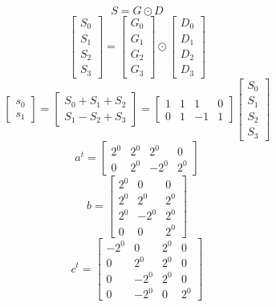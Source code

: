 \documentclass{article}%
\begin{document}
\[%
S = G \odot D%
\]%
\[%
\left[\begin{matrix}S_{0}\\S_{1}\\S_{2}\\S_{3}\end{matrix}\right] = \left[\begin{matrix}G_{0}\\G_{1}\\G_{2}\\G_{3}\end{matrix}\right] \odot \left[\begin{matrix}D_{0}\\D_{1}\\D_{2}\\D_{3}\end{matrix}\right]%
\]%
\[%
\left[\begin{matrix}s_{0}\\s_{1}\end{matrix}\right] = \left[\begin{matrix}S_{0} + S_{1} + S_{2}\\S_{1} - S_{2} + S_{3}\end{matrix}\right] = \left[\begin{matrix}1 & 1 & 1 & 0\\0 & 1 & -1 & 1\end{matrix}\right] \left[\begin{matrix}S_{0}\\S_{1}\\S_{2}\\S_{3}\end{matrix}\right]%
\]%
\[%
a^{t} = \left[\begin{matrix}2^{0} & 2^{0} & 2^{0} & 0\\0 & 2^{0} & - 2^{0} & 2^{0}\end{matrix}\right]%
\]%
\[%
b = \left[\begin{matrix}2^{0} & 0 & 0\\2^{0} & 2^{0} & 2^{0}\\2^{0} & - 2^{0} & 2^{0}\\0 & 0 & 2^{0}\end{matrix}\right]%
\]%
\[%
c^{t} = \left[\begin{matrix}- 2^{0} & 0 & 2^{0} & 0\\0 & 2^{0} & 2^{0} & 0\\0 & - 2^{0} & 2^{0} & 0\\0 & - 2^{0} & 0 & 2^{0}\end{matrix}\right]%
\]%
\end{document}
